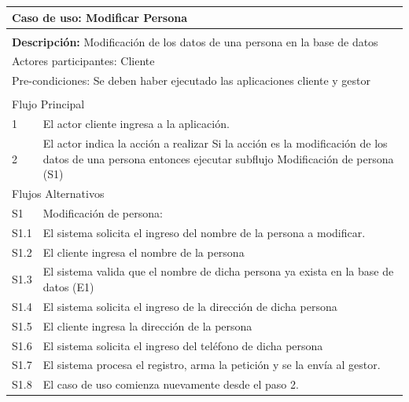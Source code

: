 \documentclass[11pt]{article}
\begin{document}
\begin{tabular}{|l|m{}|}
    \hline
    \multicolumn{2}{|m{0.9\textwidth}|}{{\bf Caso de uso: Modificar Persona}} \\
    \hline
    \multicolumn{2}{|l|}{\rowcolor[gray]{.5}} \\
    \hline
  
    \multicolumn{2}{|p{0.9\textwidth}|}{{\bf Descripción:} Modificaci\'on de los datos de una 
    persona en la base de datos } \\
  
    \hline
    \multicolumn{2}{|l|}{Actores participantes: Cliente} \\
    \hline
  
    \multicolumn{2}{|l|}{Pre-condiciones: Se deben haber ejecutado las aplicaciones cliente 
    y gestor} \\
  
    \hline
    \multicolumn{2}{|l|}{\rowcolor[gray]{.5}} \\
    \hline
    \multicolumn{2}{|l|}{Flujo Principal} \\
    \hline
    1 & El actor cliente ingresa a la aplicaci\'on. \\
    \hline
    2 &  El actor indica la acción a realizar \newline
    Si la acción es la modificaci\'on de los datos de una persona entonces ejecutar subflujo Modificaci\'on de persona (S1)\newline
   \\
    
    \hline
    \multicolumn{2}{|l|}{Flujos Alternativos} \\
    \hline
  
    S1 &  Modificaci\'on de persona: \\ \hline
    S1.1 & El sistema solicita el ingreso del nombre de la persona a modificar.\\ \hline
    S1.2 & El cliente ingresa el nombre de la persona\\ \hline
    S1.3 & El sistema valida que el nombre de dicha persona ya exista en la base de datos (E1) \\ \hline
    S1.4 & El sistema solicita el ingreso de la direcci\'on de dicha persona\\ \hline
    S1.5 & El cliente ingresa la direcci\'on de la persona\\ \hline
    S1.6 & El sistema solicita el ingreso del tel\'efono de dicha persona\\ \hline
    S1.7 & El sistema procesa el registro, arma la petici\'on y se la env\'ia al gestor.\\ \hline
    S1.8 & El caso de uso comienza nuevamente desde el paso 2.\\ \hline
    

\end{tabular}
\end{document}
